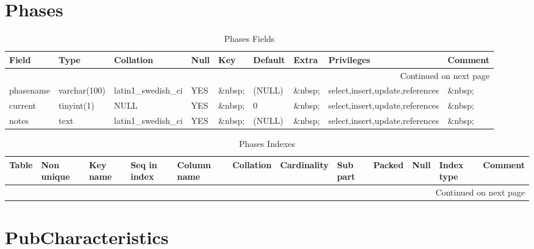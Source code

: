 \documentclass[tablesignature]{scrartcl}
\begin{document}
\section{Phases}
\label{sec-16}


\begin{longtable}{|l|l|l|l|l|l|l|l|l|}
\caption{Phases Fields} \label{tbl:phasesfields}\\
\hline
 Field      &  Type          &  Collation                &  Null     &  Key      &  Default  &  Extra              &  Privileges                       &  Comment \\
\hline
\endhead
\hline\multicolumn{9}{r}{Continued on next page}\
\endfoot
\endlastfoot
\hline
 phaseid    &  int(11)       &  NULL                     &  \&nbsp;  &  PRI      &  (NULL)   &  auto\_{}increment  &  select,insert,update,references  &  \&nbsp;  \\
 phasename  &  varchar(100)  &  latin1\_{}swedish\_{}ci  &  YES      &  \&nbsp;  &  (NULL)   &  \&nbsp;            &  select,insert,update,references  &  \&nbsp;  \\
 current    &  tinyint(1)    &  NULL                     &  YES      &  \&nbsp;  &  0        &  \&nbsp;            &  select,insert,update,references  &  \&nbsp;  \\
 notes      &  text          &  latin1\_{}swedish\_{}ci  &  YES      &  \&nbsp;  &  (NULL)   &  \&nbsp;            &  select,insert,update,references  &  \&nbsp;  \\
\hline
\end{longtable}


\begin{longtable}{|l|l|l|l|l|l|l|l|l|l|l|l|}
\caption{Phases Indexes} \label{tbl:phasesindexes}\\
\hline
 Table   &  Non unique  &  Key name  &  Seq in index  &  Column name  &  Collation  &  Cardinality  &  Sub part  &  Packed  &  Null     &  Index type  &  Comment \\
\hline
\endhead
\hline\multicolumn{12}{r}{Continued on next page}\
\endfoot
\endlastfoot
\hline
 Phases  &           0  &  PRIMARY   &             1  &  phaseid      &  A          &            4  &  (NULL)    &  (NULL)  &  \&nbsp;  &  BTREE       &  \&nbsp;  \\
\hline
\end{longtable}
\section{PubCharacteristics}
\label{sec-17}
\end{document}
